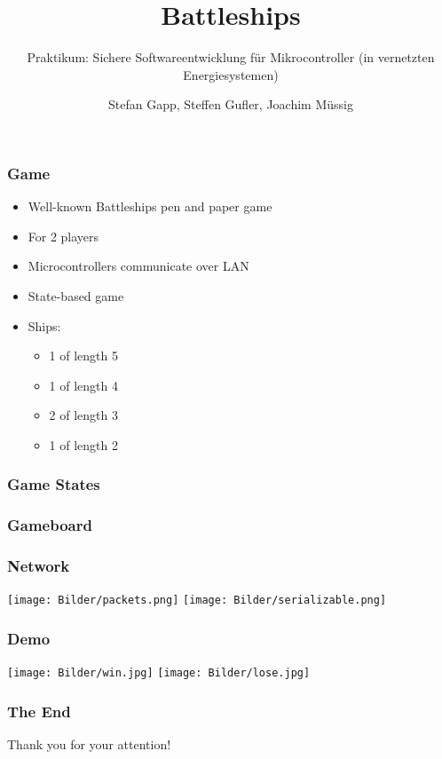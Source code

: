 \documentclass[handout]{beamer}
\title{Battleships}
\subtitle{Praktikum: Sichere Softwareentwicklung f\"ur Mikrocontroller (in vernetzten Energiesystemen)}
\author{Stefan Gapp, Steffen Gufler, Joachim M\"ussig}
\institute[\raisebox{-3.5mm}{\texttt{[image: Bilder/Zlogo]}}]
  {Stefan Gapp, Steffen Gufler, Joachim M\"ussig}
\begin{document}
\begin{frame}
  \maketitle
\end{frame}

\begin{frame}
	\frametitle{Game}
	\begin{itemize}
		\item Well-known Battleships pen and paper game
		\item For 2 players
		\item Microcontrollers communicate over LAN
		\item State-based game
		\item Ships:
			\begin{itemize}
				\item 1 of length 5
				\item 1 of length 4
				\item 2 of length 3
				\item 1 of length 2
			\end{itemize}
	\end{itemize}
\end{frame}

\begin{frame}
	\frametitle{Game States}
\end{frame}

\begin{frame}
	\frametitle{Gameboard}
\end{frame}

\begin{frame}
	\frametitle{Network}
	\texttt{[image: Bilder/packets.png]}
	\texttt{[image: Bilder/serializable.png]}
\end{frame}

\begin{frame}
	\frametitle{Demo}
	\begin{center}
		\texttt{[image: Bilder/win.jpg]}
		\texttt{[image: Bilder/lose.jpg]}
	\end{center}
\end{frame}

\begin{frame}
	\frametitle{The End}
	\begin{center}
	\Huge Thank you for your attention!
	\end{center}
\end{frame}
\end{document}
